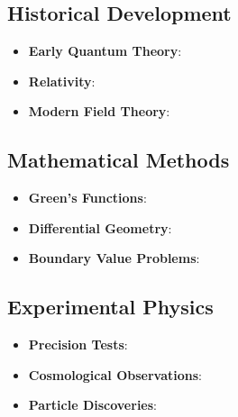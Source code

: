 \documentclass[12pt,a4paper]{article}
\begin{document}
	\subsection*{Historical Development}
	\begin{itemize}
		\item \textbf{Early Quantum Theory}: \citet{planck1900,bohr1913,heisenberg1927,debroglie1924}
		\item \textbf{Relativity}: \citet{einstein1905,einstein1915,schwarzschild1916}
		\item \textbf{Modern Field Theory}: \citet{weinberg1967,salam1968,higgs1964,englert1964}
	\end{itemize}
	
	\subsection*{Mathematical Methods}
	\begin{itemize}
		\item \textbf{Green's Functions}: \citet{jackson1998,duffy2001,roach1982}
		\item \textbf{Differential Geometry}: \citet{misner1973,abraham1988}
		\item \textbf{Boundary Value Problems}: \citet{stakgold1998,haberman2004}
	\end{itemize}
	
	\subsection*{Experimental Physics}
	\begin{itemize}
		\item \textbf{Precision Tests}: \citet{will2014,adelberger2003,murphy2003}
		\item \textbf{Cosmological Observations}: \citet{planck2020,weinberg2008}
		\item \textbf{Particle Discoveries}: \citet{aad2012,chatrchyan2012,abbott2017}
	\end{itemize}
	
\end{document}

